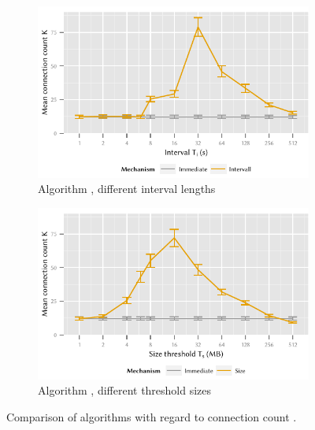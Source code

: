\begin{figure}
	\begin{subfigure}[b]{\textwidth}
	\centering
	\includegraphics{application/cloud_file_synchronization/numerical_evaluation/figures/interval_connection}
	\caption{Algorithm \algointerval, different interval lengths \thresholdInterval}\label{fig:application:cloud_file_synchronisation:numerical_evaluation:connection:connection:interval}
	\end{subfigure} 
	\begin{subfigure}[b]{\textwidth}
	\centering
	\includegraphics{application/cloud_file_synchronization/numerical_evaluation/figures/size_connection}
	\caption{Algorithm \algosize, different threshold sizes \thresholdSize}\label{fig:application:cloud_file_synchronisation:numerical_evaluation:connection:connection:size}
	\end{subfigure}

	\caption{Comparison of algorithms with regard to connection count \connectionCount.}\label{fig:application:cloud_file_synchronisation:numerical_evaluation:connection:connection}
\end{figure}

